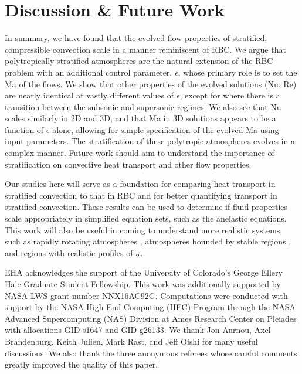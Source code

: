 \documentclass[aps, prfluids, onecolumn, notitlepage, nofootinbib, groupedaddress, amsfonts, amssymb, amsmath]{revtex4-1}
\begin{document}
\section{Discussion \& Future Work}
In summary, we have found that the evolved flow properties of stratified,
compressible convection scale in a manner reminiscent of RBC.
We argue that polytropically stratified atmospheres are the natural
extension of the RBC problem with an additional control parameter, $\epsilon$,
whose primary role is to set the Ma of the flows.  We show that other properties
of the evolved solutions (Nu, Re) are nearly identical at vastly different values
of $\epsilon$, except for where there is a transition between the subsonic
and supersonic regimes.  We also see that Nu scales similarly in 2D and 3D,
and that Ma in 3D solutions appears to be a function of $\epsilon$ alone,
allowing for simple specification of the evolved Ma using input parameters.
The stratification of 
these polytropic atmospheres evolves in a complex
manner.  Future work should aim to 
understand the importance of stratification on
convective heat transport and other flow properties.

Our studies here will serve as a foundation for 
comparing heat transport in stratified convection
to that in RBC \cite{johnston&doering2009}
and for better quantifying transport in stratified convection.  
These results can be used to determine if fluid properties
scale appropriately in simplified equation sets, 
such as the anelastic equations.
This work will also be useful in coming to understand more realistic systems, 
such as rapidly rotating atmospheres \cite{julien&all2012},
atmospheres bounded by stable regions \cite{hurlburt&all1986}, 
and regions with realistic profiles of $\kappa$.



\begin{acknowledgments}
EHA acknowledges the support of the University of Colorado's George 
Ellery Hale Graduate Student Fellowship.
This work was additionally supported by  NASA LWS grant number NNX16AC92G.  
Computations were conducted 
with support by the NASA High End Computing (HEC) Program through the NASA 
Advanced Supercomputing (NAS) Division at Ames Research Center on Pleiades
with allocations GID s1647 and GID g26133.
We thank Jon Aurnou, Axel Brandenburg, Keith Julien, Mark Rast, and Jeff Oishi 
for many useful discussions. We also thank the three anonymous referees whose
careful comments greatly improved the quality of this paper.
\end{acknowledgments}
\end{document}
